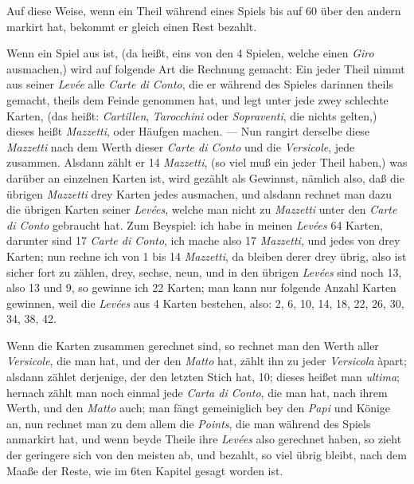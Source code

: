 \documentclass[11pt,a6paper,twoside]{article}
\begin{document}
Auf diese Weise, wenn ein Theil während eines Spiels bis auf 60 über den andern markirt hat, bekommt er gleich einen Rest bezahlt.

Wenn ein Spiel aus ist, (da heißt, eins von den 4 Spielen, welche einen \textit{Giro} ausmachen,) wird auf folgende Art die Rechnung gemacht: Ein jeder Theil nimmt aus seiner \textit{Levée} alle \textit{Carte di Conto}, die er während des Spieles darinnen theils gemacht, theils dem Feinde genommen hat, und legt unter jede zwey schlechte Karten, (das heißt: \textit{Cartillen}, \textit{Tarocchini} oder \textit{Sopraventi}, die nichts gelten,) dieses heißt \textit{Mazzetti}, oder Häufgen machen. --- Nun rangirt derselbe diese \textit{Mazzetti} nach dem Werth dieser \textit{Carte di Conto} und die \textit{Versicole}, jede zusammen. Alsdann zählt er 14 \textit{Mazzetti}, (so viel muß ein jeder Theil haben,) was darüber an einzelnen Karten ist, wird gezählt als Gewinnst, nämlich also, daß die übrigen \textit{Mazzetti} drey Karten jedes ausmachen, und alsdann rechnet man dazu die übrigen Karten seiner \textit{Levées}, welche man nicht zu \textit{Mazzetti} unter den \textit{Carte di Conto} gebraucht hat. Zum Beyspiel: ich habe in meinen \textit{Levées} 64 Karten, darunter sind 17 \textit{Carte di Conto}, ich mache also 17 \textit{Mazzetti}, und jedes von drey Karten; nun rechne ich von 1 bis 14 \textit{Mazzetti}, da bleiben derer drey übrig, also ist sicher fort zu zählen, drey, sechse, neun, und in den übrigen \textit{Levées} sind noch 13, also 13 und 9, so gewinne ich 22 Karten; man kann nur folgende Anzahl Karten gewinnen, weil die \textit{Levées} aus 4 Karten bestehen, also: 2, 6, 10, 14, 18, 22, 26, 30, 34, 38, 42.

Wenn die Karten zusammen gerechnet sind, so rechnet man den Werth aller \textit{Versicole}, die man hat, und der den \textit{Matto} hat, zählt ihn zu jeder \textit{Versicola} àpart; alsdann zählet derjenige, der den letzten Stich hat, 10; dieses heißet man \textit{ultima}; hernach zählt man noch einmal jede \textit{Carta di Conto}, die man hat, nach ihrem Werth, und den \textit{Matto} auch; man fängt gemeiniglich bey den \textit{Papi} und Könige an, nun rechnet man zu dem allem die \textit{Points}, die man während des Spiels anmarkirt hat, und wenn beyde Theile ihre \textit{Levées} also gerechnet haben, so zieht der geringere sich von den meisten ab, und bezahlt, so viel übrig bleibt, nach dem Maaße der Reste, wie im 6ten Kapitel gesagt worden ist.
\end{document}
